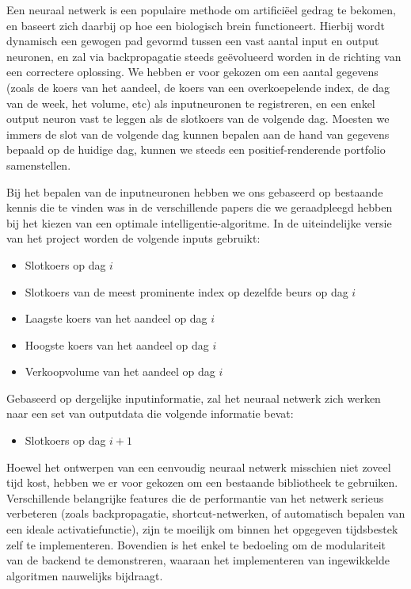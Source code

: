 Een neuraal netwerk is een populaire methode om artifici\"eel gedrag te bekomen, en baseert zich daarbij op hoe een biologisch brein functioneert. Hierbij wordt dynamisch een gewogen pad gevormd tussen een vast aantal input en output neuronen, en zal via backpropagatie steeds ge\"evolueerd worden in de richting van een correctere oplossing. We hebben er voor gekozen om een aantal gegevens (zoals de koers van het aandeel, de koers van een overkoepelende index, de dag van de week, het volume, etc) als inputneuronen te registreren, en een enkel output neuron vast te leggen als de slotkoers van de volgende dag. Moesten we immers de slot van de volgende dag kunnen bepalen aan de hand van gegevens bepaald op de huidige dag, kunnen we steeds een positief-renderende portfolio samenstellen.

Bij het bepalen van de inputneuronen hebben we ons gebaseerd op bestaande kennis die te vinden was in de verschillende papers die we geraadpleegd hebben bij het kiezen van een optimale intelligentie-algoritme. In de uiteindelijke versie van het project worden de volgende inputs gebruikt:
\begin{itemize}
\item Slotkoers op dag $i$
\item Slotkoers van de meest prominente index op dezelfde beurs op dag $i$
\item Laagste koers van het aandeel op dag $i$
\item Hoogste koers van het aandeel op dag $i$
\item Verkoopvolume van het aandeel op dag $i$
\end{itemize}

Gebaseerd op dergelijke inputinformatie, zal het neuraal netwerk zich werken naar een set van outputdata die volgende informatie bevat:
\begin{itemize}
\item Slotkoers op dag $i+1$
\end{itemize}

Hoewel het ontwerpen van een eenvoudig neuraal netwerk misschien niet zoveel tijd kost, hebben we er voor gekozen om een bestaande bibliotheek te gebruiken. Verschillende belangrijke features die de performantie van het netwerk serieus verbeteren (zoals backpropagatie, shortcut-netwerken, of automatisch bepalen van een ideale activatiefunctie), zijn te moeilijk om binnen het opgegeven tijdsbestek zelf te implementeren. Bovendien is het enkel te bedoeling om de modulariteit van de backend te demonstreren, waaraan het implementeren van ingewikkelde algoritmen nauwelijks bijdraagt.


